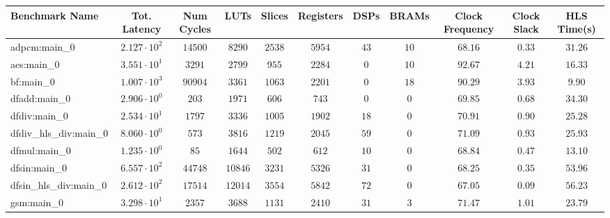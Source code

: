 \begin{tabular}{|l|c|c|c|c|c|c|c|c|c|c|}
\hline
Benchmark Name          & Tot. Latency           & Num Cycles & LUTs      & Slices    & Registers & DSPs    & BRAMs   & Clock Frequency & Clock Slack & HLS Time(s) \\
\hline
adpcm:main\_0           & $ 2.127 \cdot 10^{2} $ & $ 14500  $ & $ 8290  $ & $ 2538  $ & $ 5954  $ & $ 43  $ & $ 10  $ & $ 68.16       $ & $ 0.33    $ & $ 31.26   $ \\
aes:main\_0             & $ 3.551 \cdot 10^{1} $ & $ 3291   $ & $ 2799  $ & $ 955   $ & $ 2284  $ & $ 0   $ & $ 10  $ & $ 92.67       $ & $ 4.21    $ & $ 16.33   $ \\
bf:main\_0              & $ 1.007 \cdot 10^{3} $ & $ 90904  $ & $ 3361  $ & $ 1063  $ & $ 2201  $ & $ 0   $ & $ 18  $ & $ 90.29       $ & $ 3.93    $ & $ 9.90    $ \\
dfadd:main\_0           & $ 2.906 \cdot 10^{0} $ & $ 203    $ & $ 1971  $ & $ 606   $ & $ 743   $ & $ 0   $ & $ 0   $ & $ 69.85       $ & $ 0.68    $ & $ 34.30   $ \\
dfdiv:main\_0           & $ 2.534 \cdot 10^{1} $ & $ 1797   $ & $ 3336  $ & $ 1005  $ & $ 1902  $ & $ 18  $ & $ 0   $ & $ 70.91       $ & $ 0.90    $ & $ 25.28   $ \\
dfdiv\_hls\_div:main\_0 & $ 8.060 \cdot 10^{0} $ & $ 573    $ & $ 3816  $ & $ 1219  $ & $ 2045  $ & $ 59  $ & $ 0   $ & $ 71.09       $ & $ 0.93    $ & $ 25.93   $ \\
dfmul:main\_0           & $ 1.235 \cdot 10^{0} $ & $ 85     $ & $ 1644  $ & $ 502   $ & $ 612   $ & $ 10  $ & $ 0   $ & $ 68.84       $ & $ 0.47    $ & $ 13.10   $ \\
dfsin:main\_0           & $ 6.557 \cdot 10^{2} $ & $ 44748  $ & $ 10846 $ & $ 3231  $ & $ 5326  $ & $ 31  $ & $ 0   $ & $ 68.25       $ & $ 0.35    $ & $ 53.96   $ \\
dfsin\_hls\_div:main\_0 & $ 2.612 \cdot 10^{2} $ & $ 17514  $ & $ 12014 $ & $ 3554  $ & $ 5842  $ & $ 72  $ & $ 0   $ & $ 67.05       $ & $ 0.09    $ & $ 56.23   $ \\
gsm:main\_0             & $ 3.298 \cdot 10^{1} $ & $ 2357   $ & $ 3688  $ & $ 1131  $ & $ 2410  $ & $ 31  $ & $ 3   $ & $ 71.47       $ & $ 1.01    $ & $ 23.79   $ \\

\end{tabular}

